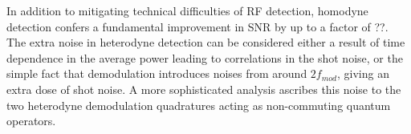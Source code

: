 

In addition to mitigating technical difficulties of RF detection,
homodyne detection confers a fundamental improvement in SNR by up to a
factor of ??. The extra noise in heterodyne detection can be
considered either a result of time dependence in the average power
leading to correlations in the shot
noise\cite{Niebauer1991Nonstationary}, or the simple fact that
demodulation introduces noises from around $2f_{mod}$, giving
an extra dose of shot noise.  A more sophisticated analysis ascribes
this noise to the two heterodyne demodulation quadratures acting as
non-commuting quantum operators\cite{Buonanno2003Quantum}.
